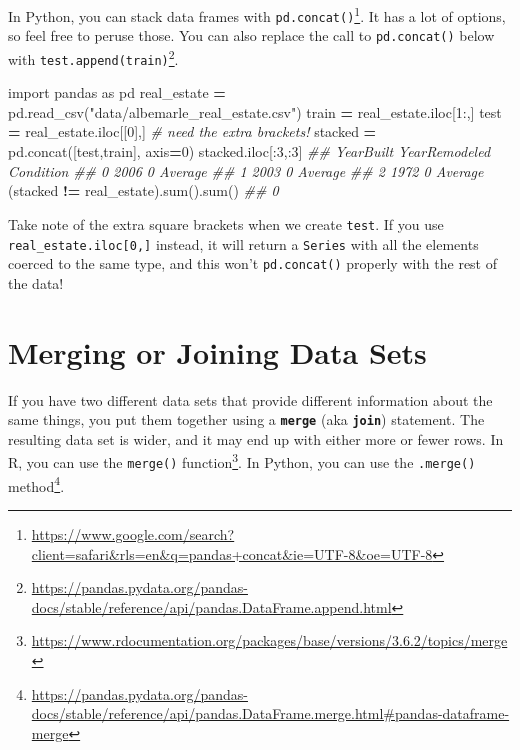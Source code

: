 \documentclass[
  12pt,
  krantz2]{krantz}
\makeatletter
\newenvironment{Shaded}{\begin{snugshade}}{\end{snugshade}}
\newcommand{\BuiltInTok}[1]{#1}
\newcommand{\CommentTok}[1]{\textcolor[rgb]{0.37,0.37,0.37}{\textit{#1}}}
\newcommand{\DecValTok}[1]{\textcolor[rgb]{0.06,0.06,0.06}{#1}}
\newcommand{\ImportTok}[1]{#1}
\newcommand{\NormalTok}[1]{#1}
\newcommand{\OperatorTok}[1]{\textcolor[rgb]{0.43,0.43,0.43}{\textbf{#1}}}
\newcommand{\StringTok}[1]{\textcolor[rgb]{0.5,0.5,0.5}{#1}}
\renewcommand{\href}[2]{#2\footnote{\url{#1}}}
\newenvironment{kframe}{%
\medskip{}
\setlength{\fboxsep}{.8em}
 \def\at@end@of@kframe{}%
 \ifinner\ifhmode%
  \def\at@end@of@kframe{\end{minipage}}%
  \begin{minipage}{\columnwidth}%
 \fi\fi%
 \def\FrameCommand##1{\hskip\@totalleftmargin \hskip-\fboxsep
 \colorbox{shadecolor}{##1}\hskip-\fboxsep
     \hskip-\linewidth \hskip-\@totalleftmargin \hskip\columnwidth}%
 \MakeFramed {\advance\hsize-\width
   \@totalleftmargin\z@ \linewidth\hsize
   \@setminipage}}%
 {\par\unskip\endMakeFramed%
 \at@end@of@kframe}
\renewenvironment{Shaded}{\begin{kframe}}{\end{kframe}}
\makeatother
\begin{document}
In Python, you can stack data frames with \href{https://www.google.com/search?client=safari\&rls=en\&q=pandas+concat\&ie=UTF-8\&oe=UTF-8}{\texttt{pd.concat()}}. It has a lot of options, so feel free to peruse those. You can also replace the call to \texttt{pd.concat()} below with \href{https://pandas.pydata.org/pandas-docs/stable/reference/api/pandas.DataFrame.append.html}{\texttt{test.append(train)}}.

\begin{Shaded}
\begin{Highlighting}[]
\ImportTok{import}\NormalTok{ pandas }\ImportTok{as}\NormalTok{ pd}
\NormalTok{real\_estate }\OperatorTok{=}\NormalTok{ pd.read\_csv(}\StringTok{"data/albemarle\_real\_estate.csv"}\NormalTok{)}
\NormalTok{train }\OperatorTok{=}\NormalTok{ real\_estate.iloc[}\DecValTok{1}\NormalTok{:,]}
\NormalTok{test }\OperatorTok{=}\NormalTok{ real\_estate.iloc[[}\DecValTok{0}\NormalTok{],] }\CommentTok{\# need the extra brackets!}
\NormalTok{stacked }\OperatorTok{=}\NormalTok{ pd.concat([test,train], axis}\OperatorTok{=}\DecValTok{0}\NormalTok{)}
\NormalTok{stacked.iloc[:}\DecValTok{3}\NormalTok{,:}\DecValTok{3}\NormalTok{]}
\CommentTok{\#\#    YearBuilt  YearRemodeled Condition}
\CommentTok{\#\# 0       2006              0   Average}
\CommentTok{\#\# 1       2003              0   Average}
\CommentTok{\#\# 2       1972              0   Average}
\NormalTok{(stacked }\OperatorTok{!=}\NormalTok{ real\_estate).}\BuiltInTok{sum}\NormalTok{().}\BuiltInTok{sum}\NormalTok{()}
\CommentTok{\#\# 0}
\end{Highlighting}
\end{Shaded}

Take note of the extra square brackets when we create \texttt{test}. If you use \texttt{real\_estate.iloc{[}0,{]}} instead, it will return a \texttt{Series} with all the elements coerced to the same type, and this won't \texttt{pd.concat()} properly with the rest of the data!

\hypertarget{merging-or-joining-data-sets}{%
\section{Merging or Joining Data Sets}\label{merging-or-joining-data-sets}}

If you have two different data sets that provide different information about the same things, you put them together using a \textbf{\texttt{merge}} (aka \textbf{\texttt{join}}) statement. The resulting data set is wider, and it may end up with either more or fewer rows. In R, you can use the \href{https://www.rdocumentation.org/packages/base/versions/3.6.2/topics/merge}{\texttt{merge()} function}. In Python, you can use the \href{https://pandas.pydata.org/pandas-docs/stable/reference/api/pandas.DataFrame.merge.html\#pandas-dataframe-merge}{\texttt{.merge()} method}.
\end{document}
